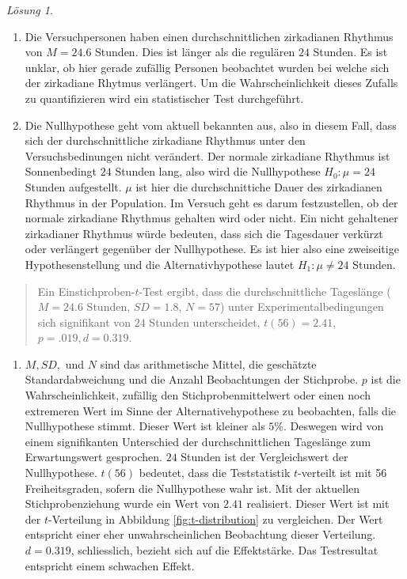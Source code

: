 \documentclass[
]{book}
\providecommand{\tightlist}{%
  \setlength{\itemsep}{0pt}\setlength{\parskip}{0pt}}
\theoremstyle{definition}
\theoremstyle{definition}
\theoremstyle{definition}
\theoremstyle{definition}
\theoremstyle{remark}
\newtheorem*{solution}{Lösung}
\begin{document}
\begin{solution}
\begin{enumerate}
\def\labelenumi{\alph{enumi})}
\tightlist
\item
  Die Versuchpersonen haben einen durchschnittlichen zirkadianen Rhythmus von \(M = 24.6\) Stunden. Dies ist länger als die regulären \(24\) Stunden. Es ist unklar, ob hier gerade zufällig Personen beobachtet wurden bei welche sich der zirkadiane Rhytmus verlängert. Um die Wahrscheinlichkeit dieses Zufalls zu quantifizieren wird ein statistischer Test durchgeführt.
\item
  Die Nullhypothese geht vom aktuell bekannten aus, also in diesem Fall, dass sich der durchschnittliche zirkadiane Rhythmus unter den Versuchsbedinungen nicht verändert. Der normale zirkadiane Rhythmus ist Sonnenbedingt \(24\) Stunden lang, also wird die Nullhypothese \(H_0: \mu = 24\) Stunden aufgestellt. \(\mu\) ist hier die durchschnittiche Dauer des zirkadianen Rhythmus in der Population. Im Versuch geht es darum festzustellen, ob der normale zirkadiane Rhythmus gehalten wird oder nicht. Ein nicht gehaltener zirkadianer Rhythmus würde bedeuten, dass sich die Tagesdauer verkürzt oder verlängert gegenüber der Nullhypothese. Es ist hier also eine zweiseitige Hypothesenstellung und die Alternativhypothese lautet \(H_1: \mu \neq 24\) Stunden.
\end{enumerate}

\begin{quote}
Ein Einstichproben-\(t\)-Test ergibt, dass die durchschnittliche Tageslänge (\(M = 24.6\) Stunden, \(SD = 1.8\), \(N = 57\)) unter Experimentalbedingungen sich signifikant von \(24\) Stunden unterscheidet, \(t(56) = 2.41\), \(p = .019, d = 0.319\).
\end{quote}

\begin{enumerate}
\def\labelenumi{\alph{enumi})}
\setcounter{enumi}{2}
\tightlist
\item
  \(M, SD,\) und \(N\) sind das arithmetische Mittel, die geschätzte Standardabweichung und die Anzahl Beobachtungen der Stichprobe. \(p\) ist die Wahrscheinlichkeit, zufällig den Stichprobenmittelwert oder einen noch extremeren Wert im Sinne der Alternativehypothese zu beobachten, falls die Nullhypothese stimmt. Dieser Wert ist kleiner als \(5\%\). Deswegen wird von einem signifikanten Unterschied der durchschnittlichen Tageslänge zum Erwartungswert gesprochen. \(24\) Stunden ist der Vergleichswert der Nullhypothese. \(t(56)\) bedeutet, dass die Teststatistik \(t\)-verteilt ist mit 56 Freiheitsgraden, sofern die Nullhypothese wahr ist. Mit der aktuellen Stichprobenziehung wurde ein Wert von \(2.41\) realisiert. Dieser Wert ist mit der \(t\)-Verteilung in Abbildung \ref{fig:t-distribution} zu vergleichen. Der Wert entspricht einer eher unwahrscheinlichen Beobachtung dieser Verteilung. \(d = 0.319\), schliesslich, bezieht sich auf die Effektstärke. Das Testresultat entspricht einem schwachen Effekt.
\end{enumerate}

\end{solution}
\end{document}
